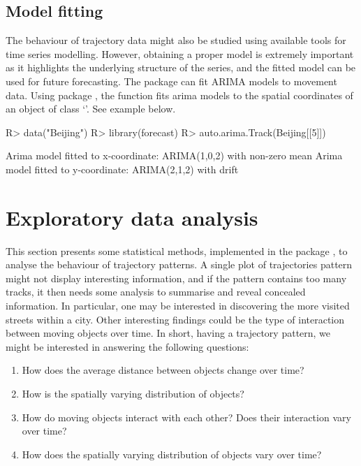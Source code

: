 \documentclass[article]{jss}
\newcommand{\class}[1]{`\code{#1}'}
\begin{document}
 \subsection{Model fitting}
  The behaviour of trajectory data might also be studied using available tools for time series modelling. However, obtaining a proper model is extremely important as it highlights the
  underlying structure of the series, and the fitted model can be used for future forecasting. The  package
   can fit ARIMA models to movement data. Using  package , the function  fits arima models to the spatial coordinates of an object of class \class{Track}. See example below.

\begin{Schunk}
\begin{Sinput}
R> data("Beijing")
R> library(forecast)
R> auto.arima.Track(Beijing[[5]])
\end{Sinput}
\begin{Soutput}
Arima model fitted to x-coordinate: ARIMA(1,0,2) with non-zero mean 
Arima model fitted to y-coordinate: ARIMA(2,1,2) with drift
\end{Soutput}
\end{Schunk}

\section{Exploratory data analysis} \label{sec:explo}
  This section presents some statistical methods, implemented in the  package , to analyse the behaviour of trajectory patterns. A single plot of trajectories pattern might not display interesting information, and if the pattern contains too many tracks, it then needs some analysis to summarise and reveal concealed information. In particular, one may be interested in discovering the more visited streets within a city. Other interesting findings could be the type of interaction between moving objects over time. In short, having a trajectory pattern, we might be interested in answering the following questions:
  \begin{enumerate}
  \item How does the average distance between objects change over time?
  \item How is the spatially varying distribution of objects?
  \item How do moving objects interact with each other? Does their interaction vary over time?
  \item How does the spatially varying distribution of objects vary over time?
  \end{enumerate}
\end{document}
